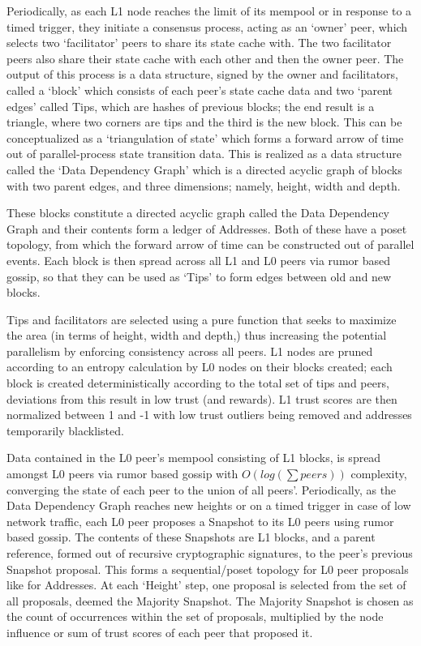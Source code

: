 \documentclass{article}
\begin{document}
Periodically, as each L1 node reaches the limit of its mempool or in response to a timed trigger, they initiate a consensus process, acting as an ‘owner’ peer, which selects two ‘facilitator’ peers to share its state cache with. The two facilitator peers also share their state cache with each other and then the owner peer. The output of this process is a data structure, signed by the owner and facilitators, called a ‘block’ which consists of each peer’s state cache data and two ‘parent edges’ called Tips, which are hashes of previous blocks; the end result is a triangle, where two corners are tips and the third is the new block. This can be conceptualized as a ‘triangulation of state’ which forms a forward arrow of time out of parallel-process state transition data. This is realized as a data structure called the ‘Data Dependency Graph’ which is a directed acyclic graph of blocks with two parent edges, and three dimensions; namely, height, width and depth. 

These blocks constitute a directed acyclic graph called the Data Dependency Graph and their contents form a ledger of Addresses. Both of these have a poset topology, from which the forward arrow of time can be constructed out of parallel events. Each block is then spread across all L1 and L0 peers via rumor based gossip, so that they can be used as ‘Tips’ to form edges between old and new blocks.

Tips and facilitators are selected using a pure function that seeks to maximize the area (in terms of height, width and depth,) thus increasing the potential parallelism by enforcing consistency across all peers. L1 nodes are pruned according to an entropy calculation by L0 nodes on their blocks created; each block is created deterministically according to the total set of tips and peers, deviations from this result in low trust (and rewards). L1 trust scores are then normalized between 1 and -1 with low trust outliers being removed and addresses temporarily blacklisted.

Data contained in the L0 peer's mempool consisting of L1 blocks, is spread amongst L0 peers via rumor based gossip with $O(log(\sum peers))$ complexity, converging the state of each peer to the union of all peers'. Periodically, as the Data Dependency Graph reaches new heights or on a timed trigger in case of low network traffic, each L0 peer proposes a Snapshot to its L0 peers using rumor based gossip. The contents of these Snapshots are L1 blocks, and a parent reference, formed out of recursive cryptographic signatures, to the peer’s previous Snapshot proposal. This forms a sequential/poset topology for L0 peer proposals like for Addresses. At each ‘Height’ step, one proposal is selected from the set of all proposals, deemed the Majority Snapshot. The Majority Snapshot is chosen as the count of occurrences within the set of proposals, multiplied by the node influence or sum of trust scores of each peer that proposed it. 
	
\end{document}
